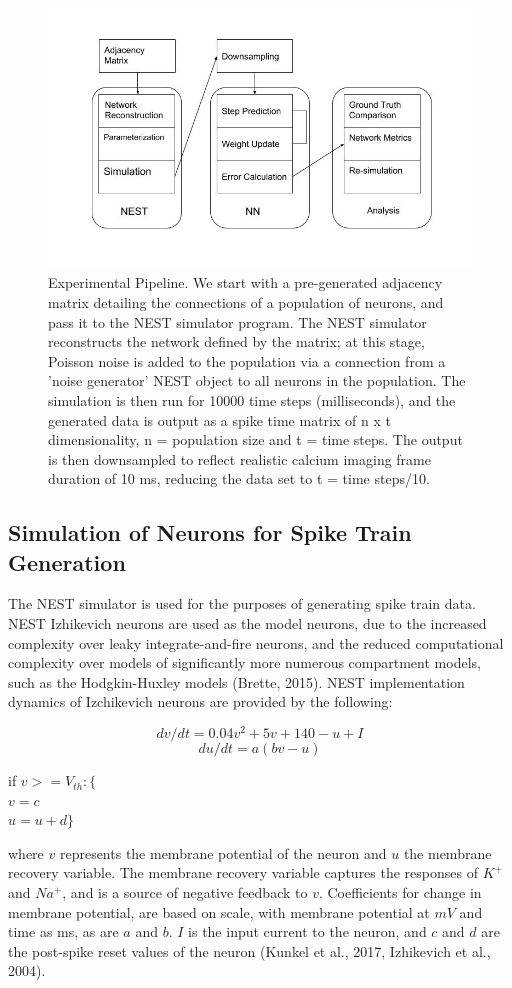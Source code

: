 \documentclass[11pt]{article}
\begin{document}
\begin{figure}[H]
\centering
	\includegraphics[scale=0.4]{./Figures/SPROJModel.jpg}
	\caption{Experimental Pipeline. We start with a pre-generated adjacency matrix detailing the connections of a population of neurons, and pass it to the NEST simulator program. The NEST simulator reconstructs the network defined by the matrix; at this stage, Poisson noise is added to the population via a connection from a 'noise generator' NEST object to all neurons in the population. The simulation is then run for 10000 time steps (milliseconds), and the generated data is output as a spike time matrix of n x t dimensionality, n = population size and t = time steps. The output is then downsampled to reflect realistic calcium imaging frame duration of 10 ms, reducing the data set to t = time steps/10.}
\end{figure}

\subsection{Simulation of Neurons for Spike Train Generation}
The NEST simulator is used for the purposes of generating spike train data. NEST Izhikevich neurons are used as the model neurons, due to the increased complexity over leaky integrate-and-fire neurons, and the reduced computational complexity over models of significantly more numerous compartment models, such as the Hodgkin-Huxley models (Brette, 2015). NEST implementation dynamics of Izchikevich neurons are provided by the following:

$$dv/dt=0.04v^2+5v+140-u+I$$
$$du/dt=a(bv-u)$$
\smallskip

{\centering
if $v >= V_{th}:\{$\\
$v = c$\\
$u = u + d\}$\par
}
where $v$ represents the membrane potential of the neuron and $u$ the membrane recovery variable. The membrane recovery variable captures the responses of $K^{+}$ and $Na^{+}$, and is a source of negative feedback to $v$. Coefficients for change in membrane potential, are based on scale, with membrane potential at $mV$ and time as ms, as are $a$ and $b$. $I$ is the input current to the neuron, and $c$ and $d$ are the post-spike reset values of the neuron (Kunkel et al., 2017, Izhikevich et al., 2004). 
\end{document}
